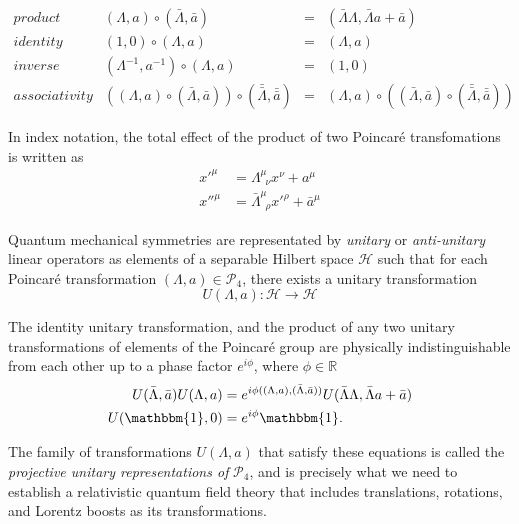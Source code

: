 \begin{equation}
\begin{array}{llll} 
product & (\Lambda, a) \circ (\bar{\Lambda}, \bar{a}) & = & (\bar{\Lambda} \Lambda, \bar{\Lambda} a + \bar{a}) \\ 
identity & (1, 0) \circ (\Lambda, a) & = & (\Lambda, a) \\ 
inverse & (\Lambda^{-1}, a^{-1}) \circ (\Lambda, a) & = & (1, 0) \\ 
associativity & \left( (\Lambda, a) \circ (\bar{\Lambda}, \bar{a}) \right) \circ (\bar{\bar{\Lambda}}, \bar{\bar{a}}) & = & (\Lambda, a) \circ \left( (\bar{\Lambda}, \bar{a}) \circ (\bar{\bar{\Lambda}}, \bar{\bar{a}}) \right)
\end{array}
\end{equation}

\noindent In index notation, the total effect of the product of two Poincar\'e transfomations is written as
\begin{align}
x'^\mu &= \Lambda^\mu_{\,\,\,\nu} x^\nu + a^\mu \\
x''^\mu &= \bar{\Lambda}^\mu_{\,\,\,\rho} x'^\rho + \bar{a}^\mu
\end{align}

\noindent Quantum mechanical symmetries are representated by \textit{unitary} or \textit{anti-unitary} linear operators as elements of a separable Hilbert space $\mathscr{H}$ such that for each Poincar\'e transformation $(\Lambda, a) \in \mathcal{P}_4$, there exists a unitary transformation 
\begin{equation}
U(\Lambda, a) : \mathscr{H} \rightarrow \mathscr{H}
\end{equation}

\noindent The identity unitary transformation, and the product of any two unitary transformations of elements of the Poincar\'e group are physically indistinguishable from each other up to a phase factor $e^{i\phi}$, where $\phi \in \mathbb{R}$
\begin{align}
U(\bar{\Lambda}, \bar{a}) U(\Lambda, a) &= e^{i\phi((\Lambda, a),(\bar{\Lambda}, \bar{a}))} U(\bar{\Lambda} \Lambda, \bar{\Lambda} a + \bar{a}) \\
U(\mathbbm{1}, 0) &= e^{i\phi} \mathbbm{1} .
\end{align}

\noindent The family of transformations $U(\Lambda, a)$ that satisfy these equations is called the \textit{projective unitary representations of} $\mathcal{P}_4$, and is precisely what we need to establish a relativistic quantum field theory that includes translations, rotations, and Lorentz boosts as its transformations.\\

